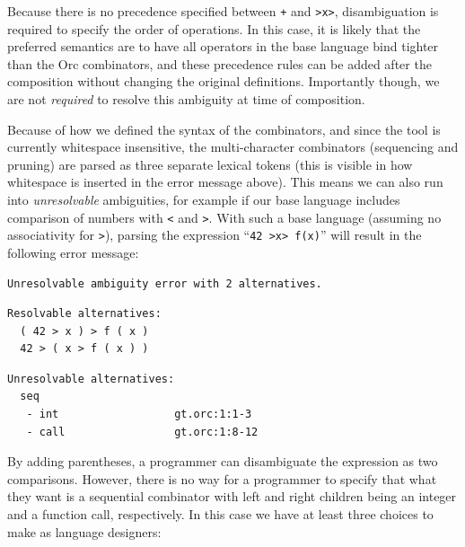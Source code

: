 \documentclass[runningheads]{llncs}
\newcommand{\ocaml}{\lstinline[language={[objective]caml}]}
\begin{document}
\noindent
Because there is no precedence specified between \ocaml{+} and
\ocaml{>x>}, disambiguation is required to specify the order of
operations.
%
In this case, it is likely that the preferred semantics are to have
all operators in the base language bind tighter than the Orc
combinators, and these precedence rules can be added after the
composition without changing the original definitions. Importantly
though, we are not \emph{required} to resolve this ambiguity at
time of composition.

Because of how we defined the syntax of the combinators, and since
the tool is currently whitespace insensitive, the
multi-character combinators (sequencing and pruning) are parsed as
three separate lexical tokens (this is visible in how whitespace
is inserted in the error message above). This means we can also
run into \emph{unresolvable} ambiguities, for example if our base
language includes comparison of numbers with \ocaml{<} and
\ocaml{>}. With such a base language (assuming no associativity
for \ocaml{>}), parsing the expression
%
``\ocaml{42 >x> f(x)}''
%
will result in the following error message:

{\small
\begin{lstlisting}[language={[objective]caml}]
Unresolvable ambiguity error with 2 alternatives.
\end{lstlisting}

\begin{minipage}{.3\textwidth}
\begin{lstlisting}[language={[objective]caml}]
Resolvable alternatives:
  ( 42 > x ) > f ( x )
  42 > ( x > f ( x ) )
\end{lstlisting}
\end{minipage}
\hfill
\begin{minipage}{.5\textwidth}
\begin{lstlisting}[language={[objective]caml}]
Unresolvable alternatives:
  seq
   - int                  gt.orc:1:1-3
   - call                 gt.orc:1:8-12
\end{lstlisting}
\end{minipage}
}

\noindent
By adding parentheses, a programmer can disambiguate the
expression as two comparisons. However, there is no way for a
programmer to specify that what they want is a sequential
combinator with left and right children being an integer and a
function call, respectively. In this case we have at least three
choices to make as language designers:
\end{document}
